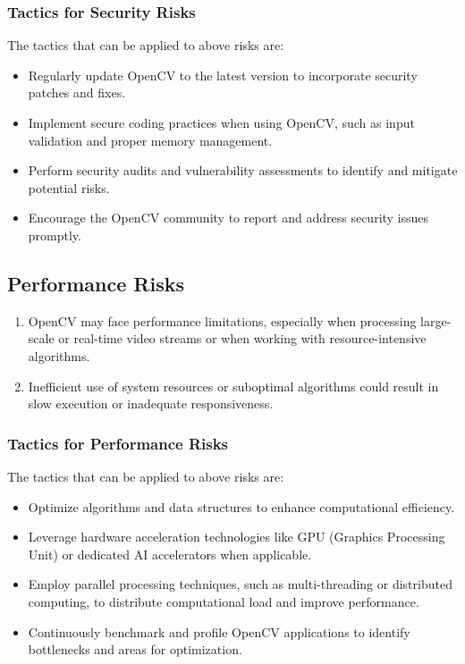 \subsubsection{Tactics for Security Risks \label{subsubSection::SecurityTactic}}
The tactics that can be applied to above risks are:
\begin{itemize}
    \item Regularly update OpenCV to the latest version to incorporate security patches and fixes.
    \item Implement secure coding practices when using OpenCV, such as input validation and proper memory management.
    \item Perform security audits and vulnerability assessments to identify and mitigate potential risks.
    \item Encourage the OpenCV community to report and address security issues promptly.
\end{itemize}
\subsection{Performance Risks \label{subSection::PerformanceRisk}}
\begin{enumerate}
     \item OpenCV may face performance limitations, especially when processing large-scale or real-time video streams or when working with resource-intensive algorithms.
     \item Inefficient use of system resources or suboptimal algorithms could result in slow execution or inadequate responsiveness.    
 \end{enumerate}

 \subsubsection{Tactics for Performance Risks \label{subsubSection::PerformanceTactic}}
The tactics that can be applied to above risks are:
\begin{itemize}
    \item Optimize algorithms and data structures to enhance computational efficiency.
    \item Leverage hardware acceleration technologies like GPU (Graphics Processing Unit) or dedicated AI accelerators when applicable.
    \item Employ parallel processing techniques, such as multi-threading or distributed computing, to distribute computational load and improve performance.
    \item Continuously benchmark and profile OpenCV applications to identify bottlenecks and areas for optimization.
\end{itemize}


